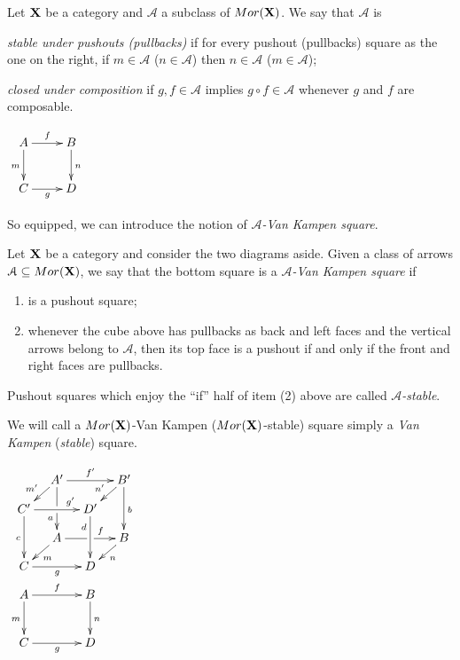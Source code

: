 \documentclass[a4paper,UKenglish,cleveref,pdftex, thm-restate,numberwithinsect,anonymous]{lipics}
\newcommand{\mor}{\mathsf{Mor}}
\def\A{\textbf {\textup{A}}}
\def\C{\textbf {\textup{C}}}
\def\X{\textbf {\textup{X}}}
\begin{document}
\begin{definition}
  Let $\X$ be a category and $\mathcal{A}$ a subclass of
  $\mor(\X)$. We say that $\mathcal{A}$ is
  \begin{itemize}
    \parbox{11cm}{\item
      \emph{stable under pushouts (pullbacks)} if for every pushout (pullbacks) square as the one on the right, 	if $m \in \mathcal{A}$ ($n\in \mathcal{A}$) then $n \in \mathcal{A}$ ($m \in \mathcal{A}$);
    \item \emph{closed under composition} if $g, f\in \mathcal{A}$ implies $g\circ f\in \mathcal{A}$ whenever $g$ and $f$ are composable.{\tiny }}\hfill
    \parbox{2cm}{$\xymatrix{A\ar[r]^f  \ar[d]_{m}& B \ar[d]^n \\ C \ar[r]_g & D}$}
    \parbox{11cm}{}\hfill
  \end{itemize}
\end{definition}

So equipped, we can introduce the notion of \emph{$\mathcal{A}$-Van Kampen square}.

\noindent
\parbox{10cm}{
  \begin{definition}
    Let $\X$ be a category and consider the two diagrams aside.
    Given  a class of arrows $\mathcal{A}\subseteq \mor(\X)$, we say that the bottom square
    is a \emph{$\mathcal{A}$-Van Kampen square} if
    \begin{enumerate}
    \item is a pushout square;
    \item 	whenever the cube above has pullbacks as back and left faces and the vertical arrows belong to $\mathcal{A}$, then its top face is a pushout 
    if and only if the front and right faces are pullbacks.
    \end{enumerate}
    Pushout squares which enjoy the ``if'' half of item (2) above are called \emph{$\mathcal{A}$-stable}.
    
    We will call a $\mor(\X)$-Van Kampen ($\mor(\X)$-stable) square simply a \emph{Van Kampen} (\emph{stable}) square.
  \end{definition}}
\parbox{2cm}{$\xymatrix@C=10pt@R=10pt{&A'\ar[dd]|\hole_(.65){a}\ar[rr]^{f'} \ar[dl]_{m'} && B' \ar[dd]^{b} \ar[dl]_{n'} \\ C'  \ar[dd]_{c}\ar[rr]^(.7){g'} & & D' \ar[dd]_(.3){d}\\&A\ar[rr]|\hole^(.65){f} \ar[dl]^{m} && B \ar[dl]^{n} \\C \ar[rr]_{g} & & D \\A \ar[dd]_{m}\ar[rr]^{f}&&B\ar[dd]^{n}\\ \\C\ar[rr]_{g} &&D}$ }
\end{document}
